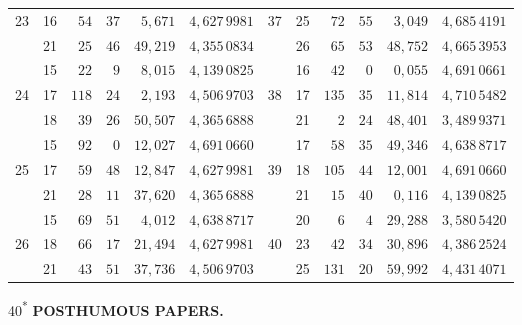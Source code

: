 \begin{center}
\begin{tabular}{|c|c|r@{\;}r@{\;}r|c||c|c|r@{\;}r@{\;}r|c|}
23 & 16 & $54$ & $37$ & $5{,}671$ & $4{,}627\,9981$ & 37 & 25 & $72$ & $55$ & $3{,}049$ & $4{,}685\,4191$\\
 & 21 & $25$ & $46$ & $49{,}219$ & $4{,}355\,0834$ &  & 26 & $65$ & $53$ & $48{,}752$ & $4{,}665\,3953$\\[3pt]
 & 15 & $22$ & $9$ & $8{,}015$ & $4{,}139\,0825$ &  & 16 & $42$ & $0$ & $0{,}055$ & $4{,}691\,0661$\\
24 & 17 & $118$ & $24$ & $2{,}193$ & $4{,}506\,9703$ & 38 & 17 & $135$ & $35$ & $11{,}814$ & $4{,}710\,5482$\\
 & 18 & $39$ & $26$ & $50{,}507$ & $4{,}365\,6888$ &  & 21 & $2$ & $24$ & $48{,}401$ & $3{,}489\,9371$\\[3pt]
 & 15 & $92$ & $0$ & $12{,}027$ & $4{,}691\,0660$ &  & 17 & $58$ & $35$ & $49{,}346$ & $4{,}638\,8717$\\
25 & 17 & $59$ & $48$ & $12{,}847$ & $4{,}627\,9981$ & 39 & 18 & $105$ & $44$ & $12{,}001$ & $4{,}691\,0660$\\
 & 21 & $28$ & $11$ & $37{,}620$ & $4{,}365\,6888$ &  & 21 & $15$ & $40$ & $0{,}116$ & $4{,}139\,0825$\\[3pt]
 & 15 & $69$ & $51$ & $4{,}012$ & $4{,}638\,8717$ &  & 20 & $6$ & $4$ & $29{,}288$ & $3{,}580\,5420$\\
26 & 18 & $66$ & $17$ & $21{,}494$ & $4{,}627\,9981$ & 40 & 23 & $42$ & $34$ & $30{,}896$ & $4{,}386\,2524$\\
 & 21 & $43$ & $51$ & $37{,}736$ & $4{,}506\,9703$ &  & 25 & $131$ & $20$ & $59{,}992$ & $4{,}431\,4071$\\
\end{tabular}\end{center}
\hfill40\textsuperscript{*}
\clearpage
{}\hfill\textbf{POSTHUMOUS PAPERS.}
